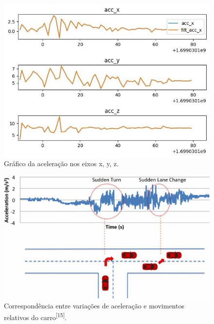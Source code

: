 \begin{figure}[hp]
    \centering
    
    \includegraphics[scale=0.8]{figures/acelaracao.jpg}
    
    \caption{Gráfico da aceleração nos eixos x, y, z.}
    
    \label{fig:aceleracao}
\end{figure}

\begin{figure}[hp]
    \centering
    
    \includegraphics[scale=0.6]{figures/sudden_acc_car.jpg}
    
    \caption{Correspondência entre variações de aceleração e movimentos relativos do carro\textsuperscript{[15]}.}
    
    \label{fig:sudden_acc_car}
\end{figure}

